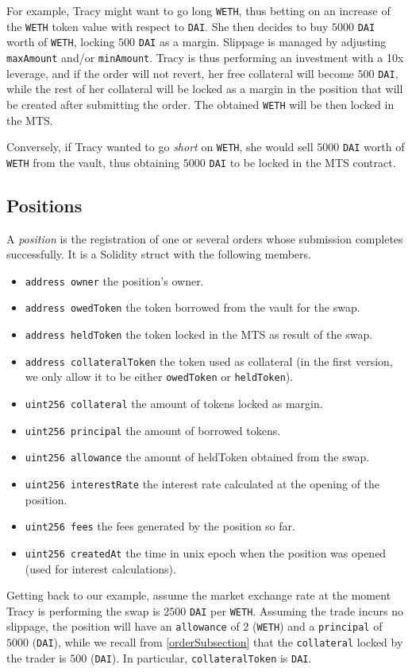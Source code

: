 \documentclass [10pt, fancyhdr, twoside] {article}
\begin{document}
For example, Tracy might want to go long \verb|WETH|, thus betting on an increase of the \verb|WETH| token value with respect to \verb|DAI|. She then decides to buy $5000$ \verb|DAI| worth of \verb|WETH|, locking $500$ \verb|DAI| as a margin. Slippage is managed by adjusting \verb|maxAmount| and/or \verb|minAmount|. Tracy is thus performing an investment with a 10x leverage, and if the order will not revert, her free collateral will become $500$ \verb|DAI|, while the rest of her collateral will be locked as a margin in the position that will be created after submitting the order. The obtained \verb|WETH| will be then locked in the MTS.

Conversely, if Tracy wanted to go \textit{short} on \verb|WETH|, she would sell $5000$ \verb|DAI| worth of \verb|WETH| from the vault, thus obtaining $5000$ \verb|DAI| to be locked in the MTS contract.
 
\subsection{Positions}\label{positionSubsection}
A \textit{position} is the registration of one or several orders whose submission completes successfully. It is a Solidity struct with the following members.
\begin{itemize}
\item \verb|address owner| the position's owner.
\item \verb|address owedToken| the token borrowed from the vault for the swap.
\item \verb|address heldToken| the token locked in the MTS as result of the swap.
\item \verb|address collateralToken| the token used as collateral (in the first version, we only allow it to be either \verb|owedToken| or \verb|heldToken|).
\item \verb|uint256 collateral| the amount of tokens locked as margin.
\item \verb|uint256 principal| the amount of borrowed tokens.
\item \verb|uint256 allowance| the amount of heldToken obtained from the swap.
\item \verb|uint256 interestRate| the interest rate calculated at the opening of the position.
\item \verb|uint256 fees| the fees generated by the position so far.
\item \verb|uint256 createdAt| the time in unix epoch when the position was opened (used for interest calculations).
\end{itemize}
Getting back to our example, assume the market exchange rate at the moment Tracy is performing the swap is $2500$ \verb|DAI| per \verb|WETH|. Assuming the trade incurs no slippage, the position will have an \verb|allowance| of $2$ (\verb|WETH|) and a \verb|principal| of $5000$ (\verb|DAI|), while we recall from \ref{orderSubsection} that the \verb|collateral| locked by the trader is $500$ (\verb|DAI|). In particular, \verb|collateralToken| is \verb|DAI|.
\end{document}
